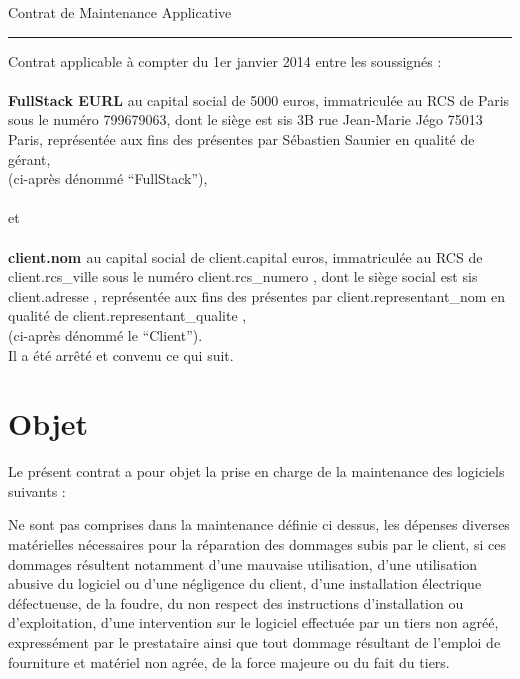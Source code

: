 \documentclass[11pt]{article}
\begin{document}
\begin{center}
{\Large Contrat de Maintenance Applicative}
\end{center}

\vspace{.5cm}

\hrule height .1mm

\vspace{.5cm}

\noindent Contrat applicable à compter du 1er janvier 2014 entre les soussignés :
\\
\\
{\textbf{FullStack EURL} au capital social de 5000 euros, immatriculée au RCS de Paris sous le numéro 799679063, dont le siège est sis 3B rue Jean-Marie Jégo 75013 Paris, représentée aux fins des présentes par Sébastien Saunier en qualité de gérant,
}
\\
(ci-après dénommé ``FullStack''),
\\
\\
et
\\
\\
{\textbf{ {{ client.nom }} } au capital social de {{ client.capital }} euros, immatriculée au RCS de {{ client.rcs_ville }} sous le numéro {{ client.rcs_numero }}, dont le siège social est sis {{ client.adresse }}, représentée aux fins des présentes par {{ client.representant_nom }} en qualité de {{ client.representant_qualite }},
}
\\
(ci-après dénommé le ``Client'').
\\

Il a été arrêté et convenu ce qui suit.

\section{Objet}

Le présent contrat a pour objet la prise en charge de la maintenance des logiciels suivants :


Ne sont pas comprises dans la maintenance définie ci dessus, les dépenses diverses matérielles nécessaires pour la réparation des dommages subis par le client, si ces dommages résultent notamment d'une mauvaise utilisation, d'une utilisation abusive du logiciel ou d'une négligence du client, d'une installation électrique défectueuse, de la foudre, du non respect des instructions d'installation ou d'exploitation, d'une intervention sur le logiciel effectuée par un tiers non agréé, expressément par le prestataire ainsi que tout dommage résultant de l'emploi de fourniture et matériel non agrée, de la force majeure ou du fait du tiers.
\end{document}
